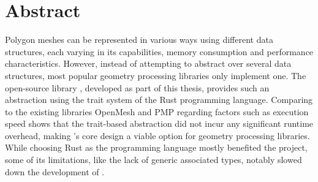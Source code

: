 \chapter*{\hfill Abstract}

Polygon meshes can be represented in various ways using different data structures, each varying in its capabilities, memory consumption and performance characteristics.
However, instead of attempting to abstract over several data structures, most popular geometry processing libraries only implement one.
The open-source library , developed as part of this thesis, provides such an abstraction using the trait system of the Rust programming language.
Comparing  to the existing libraries OpenMesh and PMP regarding factors such as execution speed shows that the trait-based abstraction did not incur any significant runtime overhead, making 's core design a viable option for geometry processing libraries.
While choosing Rust as the programming language mostly benefited the project, some of its limitations, like the lack of generic associated types, notably slowed down the development of .
